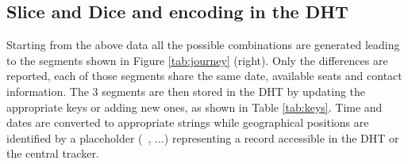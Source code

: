 \subsection{Slice and Dice and encoding in the DHT}
%
Starting from the above data all the possible combinations are
generated leading to the segments shown in Figure \ref{tab:journey}
(right). Only the differences are reported, each of those segments
share the same date, available seats and contact information.  The 3
segments are then stored in the DHT by updating the appropriate keys
or adding new ones, as shown in Table \ref{tab:keys}.  Time and dates
are converted to appropriate strings while geographical positions are
identified by a placeholder (\ie\ , ...)
representing a record accessible in the DHT or the central tracker.
%
\begin{table}
  \begin{center}
  \end{center}
  

\end{table}
